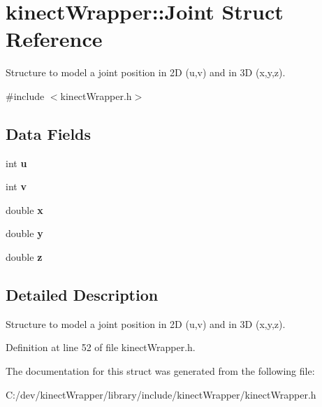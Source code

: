 \section{kinect\+Wrapper\+:\+:Joint Struct Reference}
\label{structkinectWrapper_1_1Joint}


Structure to model a joint position in 2\+D (u,v) and in 3\+D (x,y,z).  




{\ttfamily \#include $<$kinect\+Wrapper.\+h$>$}

\subsection*{Data Fields}
\begin{DoxyCompactItemize}
\item 
int {\bfseries u}\label{structkinectWrapper_1_1Joint_a8ed49e3df7ad96e08302a55f0254e6dc}

\item 
int {\bfseries v}\label{structkinectWrapper_1_1Joint_a3abbe494241126336a73e2c5cce4e455}

\item 
double {\bfseries x}\label{structkinectWrapper_1_1Joint_a427ceeb404a1a46e5d7e98566505ad29}

\item 
double {\bfseries y}\label{structkinectWrapper_1_1Joint_a45a9ab5ca36f6e39bcb0d8cd01249fef}

\item 
double {\bfseries z}\label{structkinectWrapper_1_1Joint_aff60e74868c4241a592ae7eb05ab5176}

\end{DoxyCompactItemize}


\subsection{Detailed Description}
Structure to model a joint position in 2\+D (u,v) and in 3\+D (x,y,z). 

Definition at line 52 of file kinect\+Wrapper.\+h.



The documentation for this struct was generated from the following file\+:\begin{DoxyCompactItemize}
\item 
C\+:/dev/kinect\+Wrapper/library/include/kinect\+Wrapper/kinect\+Wrapper.\+h\end{DoxyCompactItemize}
